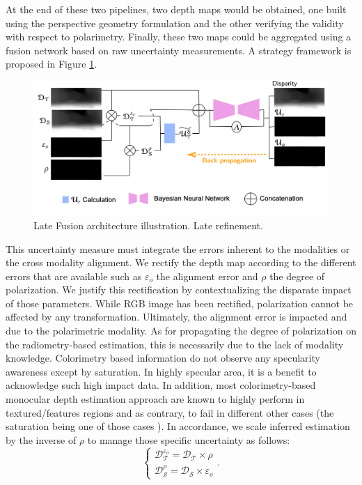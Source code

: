 At the end of these two pipelines, two depth maps would be obtained, one built using the perspective geometry formulation and the other verifying the validity with respect to polarimetry.
Finally, these two maps could be aggregated using a fusion network based on raw uncertainty measurements. A strategy framework is proposed in Figure \ref{fig:late2}.

\begin{figure}[h]
	\centering
	\includegraphics[width=0.8\linewidth]{Figures/Fusion/late2}
	\caption[Late Fusion architecture illustration. Late refinement.]{Late Fusion architecture illustration. Late refinement.}
	\label{fig:late2}
\end{figure}

This uncertainty measure must integrate the errors inherent to the modalities or the cross modality alignment.
We rectify the depth map according to the different errors that are available such as $\varepsilon_o$ the alignment error and $\rho$ the degree of polarization. We justify this rectification by contextualizing the disparate impact of those parameters. While RGB image has been rectified, polarization cannot be affected by any transformation. Ultimately, the alignment error is impacted and due to the polarimetric modality. As for propagating the degree of polarization on the radiometry-based estimation, this is necessarily due to the lack of modality knowledge. Colorimetry based information do not observe any specularity awareness except by saturation. In highly specular area, it is a benefit to acknowledge such high impact data. In addition, most colorimetry-based monocular depth estimation approach are known to highly perform in textured/features regions and as contrary, to fail in different other cases (the saturation being one of those cases ). In accordance, we scale inferred estimation by the inverse of $\rho$ to manage those specific uncertainty as follows:
\begin{equation}
\begin{cases}  
\mathcal{D}_{\mathcal{T}}^{\varepsilon_o} =  \mathcal{D}_{\mathcal{T}} \times \rho\\[8pt] 

\mathcal{D}_{\mathcal{S}}^{\rho} =  \mathcal{D}_{\mathcal{S}} \times \varepsilon_o

\end{cases}.
\end{equation}

